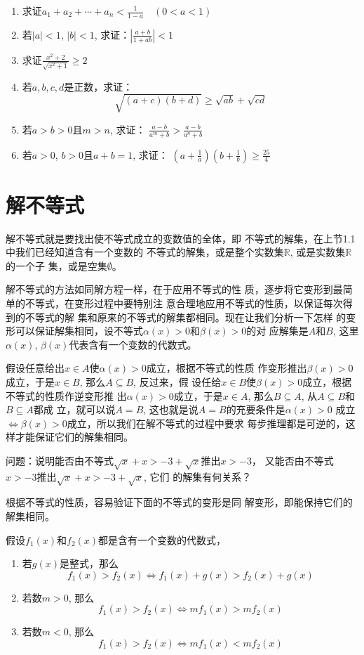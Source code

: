 \begin{enumerate}
\item 求证$a_1+a_2+\cdots+a_n<\frac{1}{1-a}\quad (0<a<1)$

\item 若$|a|<1$, $|b|<1$, 求证：$\left|\frac{a+b}{1+ab}\right|<1$

\item 求证$\frac{x^2+2}{\sqrt{x^2+1}}\ge 2$

\item 若$a,b,c,d$是正数，求证：
$$\sqrt{(a+c)(b+d)}\ge \sqrt{ab}+\sqrt{cd}$$
\item 若$a>b>0$且$m>n$, 求证：
$\frac{a-b}{a^m+b}>\frac{a-b}{a^n+b}$

\item 若$a>0$, $b>0$且$a+b=1$, 求证：
$\left(a+\frac{1}{a}\right)\left(b+\frac{1}{b}\right)\ge \frac{25}{4}$
\end{enumerate}

\section{解不等式}
解不等式就是要找出使不等式成立的变数值的全体，即
不等式的解集，在上节1.1中我们已经知道含有一个变数的
不等式的解集，或是整个实数集$\mathbb{R}$, 或是实数集$\mathbb{R}$的一个子
集，或是空集$\emptyset$。

解不等式的方法如同解方程一样，在于应用不等式的性
质，逐步将它变形到最简单的不等式，在变形过程中要特别注
意合理地应用不等式的性质，以保证每次得到的不等式的解
集和原来的不等式的解集都相同。现在让我们分析一下怎样
的变形可以保证解集相同，设不等式$\alpha(x)>0$和$\beta(x)>0$的对
应解集是$A$和$B$, 这里$\alpha(x)$, $\beta(x)$代表含有一个变数的代数式。

假设任意给出$x\in A$使$\alpha(x)>0$成立，根据不等式的性质
作变形推出$\beta(x)>0$成立，于是$x\in B$, 那么$A\subseteq B$, 反过来，假
设任给$x\in B$使$\beta(x)>0$成立，根据不等式的性质作逆变形推
出$\alpha(x)>0$成立，于是$x\in A$, 那么$B\subseteq A$, 从$A\subseteq B$和$B\subseteq A$都成
立，就可以说$A=B$, 这也就是说$A=B$的充要条件是$\alpha(x)>0$
成立$\Longleftrightarrow\beta(x)>0$成立，所以我们在解不等式的过程中要求
每步推理都是可逆的，这样才能保证它们的解集相同。

问题：说明能否由不等式$\sqrt{x}+x>-3+\sqrt{x}$推出$x>-3$，
又能否由不等式$x>-3$推出$\sqrt{x}+x>-3+\sqrt{x}$, 它们
的解集有何关系？

根据不等式的性质，容易验证下面的不等式的变形是同
解变形，即能保持它们的解集相同。

假设$f_1(x)$和$f_2(x)$都是含有一个变数的代数式，
\begin{enumerate}
    \item 若$g(x)$是整式，那么
    \[f_1(x)>f_2(x)\Longleftrightarrow f_1(x)+g(x)>f_2(x)+g(x)\]
    \item 若数$m>0$, 那么
    \[f_1(x)>f_2(x)\Longleftrightarrow mf_1(x)>mf_2(x)\]
    \item 若数$m<0$, 那么
    \[f_1(x)>f_2(x)\Longleftrightarrow mf_1(x)<mf_2(x)\]
\end{enumerate}


